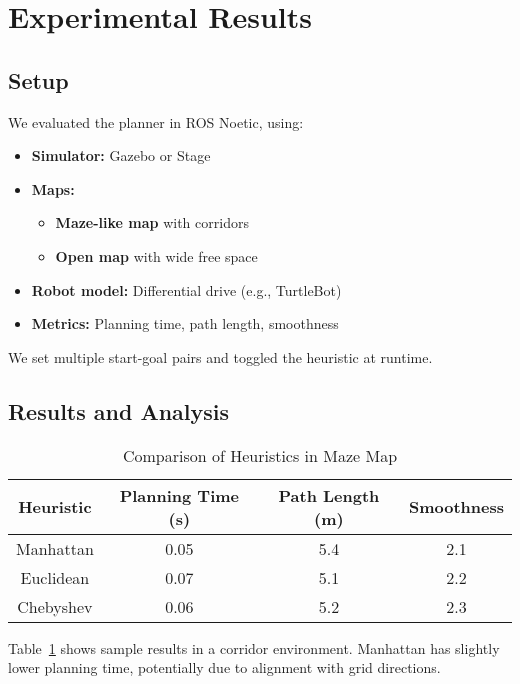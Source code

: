 \documentclass[letterpaper, 10 pt, conference]{ieeeconf}
\begin{document}
\section{Experimental Results}\label{sec:experiments}

\subsection{Setup}
We evaluated the planner in ROS Noetic, using:
\begin{itemize}
    \item \textbf{Simulator:} Gazebo or Stage
    \item \textbf{Maps:} 
        \begin{itemize}
            \item \textbf{Maze-like map} with corridors
            \item \textbf{Open map} with wide free space
        \end{itemize}
    \item \textbf{Robot model:} Differential drive (e.g., TurtleBot)
    \item \textbf{Metrics:} Planning time, path length, smoothness
\end{itemize}
We set multiple start-goal pairs and toggled the heuristic at runtime.

\subsection{Results and Analysis}
\begin{table}[!ht]
\centering
\footnotesize
\caption{Comparison of Heuristics in Maze Map}
\label{table:maze}
\begin{tabular}{|c|c|c|c|}
\hline
\textbf{Heuristic} & \textbf{Planning Time (s)} & \textbf{Path Length (m)} & \textbf{Smoothness}\\
\hline
Manhattan & 0.05 & 5.4 & 2.1 \\
Euclidean & 0.07 & 5.1 & 2.2 \\
Chebyshev & 0.06 & 5.2 & 2.3 \\
\hline
\end{tabular}
\end{table}

Table~\ref{table:maze} shows sample results in a corridor environment. 
Manhattan has slightly lower planning time, potentially due to alignment 
with grid directions.
\end{document}

